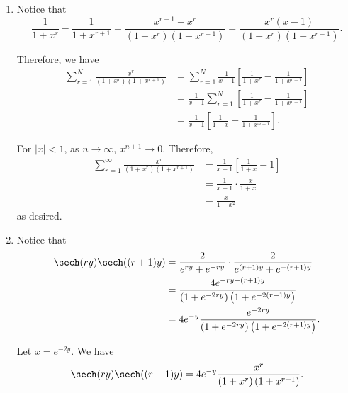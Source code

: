 \Question{\currfilebase}

\begin{enumerate}
    \item Notice that
          \[
              \frac{1}{1 + x^r} - \frac{1}{1 + x^{r + 1}} = \frac{x^{r + 1} - x^r}{(1 + x^r)(1 + x^{r + 1})} = \frac{x^r (x - 1)}{(1 + x^r)(1 + x^{r + 1})}.
          \]

          Therefore, we have
          \begin{align*}
              \sum_{r = 1}^{N} \frac{x^r}{(1 + x^r)(1 + x^{r + 1})} & = \sum_{r = 1}^{N} \frac{1}{x - 1} \left[\frac{1}{1 + x^r} - \frac{1}{1 + x^{r + 1}}\right] \\
                                                                    & = \frac{1}{x - 1} \sum_{r = 1}^{N}\left[\frac{1}{1 + x^r} - \frac{1}{1 + x^{r + 1}}\right]  \\
                                                                    & = \frac{1}{x - 1} \left[\frac{1}{1 + x} - \frac{1}{1 + x^{n + 1}}\right].
          \end{align*}

          For \(|x| < 1\), as \(n \to \infty\), \(x^{n + 1} \to 0\). Therefore,
          \begin{align*}
              \sum_{r = 1}^{\infty} \frac{x^r}{(1 + x^r)(1 + x^{r + 1})} & = \frac{1}{x - 1} \left[\frac{1}{1 + x} - 1\right] \\
                                                                         & = \frac{1}{x - 1} \cdot \frac{-x}{1 + x}           \\
                                                                         & = \frac{x}{1 - x^2}
          \end{align*}
          as desired.

    \item Notice that
          \begin{align*}
              \sech (ry) \sech((r + 1)y) & = \frac{2}{e^{ry} + e^{-ry}} \cdot \frac{2}{e^{(r + 1)y} + e^{-(r + 1)y}}             \\
                                         & = \frac{4e^{-ry - (r + 1)y}}{\left(1 + e^{-2ry}\right) \left(1 + e^{-2(r+1)y}\right)} \\
                                         & = 4 e^{-y} \frac{e^{-2ry}}{\left(1 + e^{-2ry}\right) \left(1 + e^{-2(r+1)y}\right)}.
          \end{align*}

          Let \(x = e^{-2y}\). We have
          \[
              \sech (ry) \sech((r + 1)y) = 4e^{-y} \frac{x^r}{\left(1 + x^r\right)\left(1 + x^{r + 1}\right)}.
          \]


\end{enumerate}
